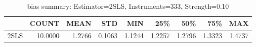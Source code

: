 \begin{table}[ht]
\centering
\caption{bias summary: Estimator=2SLS, Instruments=333, Strength=0.10}
\begin{tabular}{lrrrrrrrr}
\toprule
 & COUNT & MEAN & STD & MIN & 25\% & 50\% & 75\% & MAX \\
\midrule
2SLS & 10.0000 & 1.2766 & 0.1063 & 1.1244 & 1.2257 & 1.2796 & 1.3323 & 1.4737 \\
\bottomrule
\end{tabular}
\end{table}
